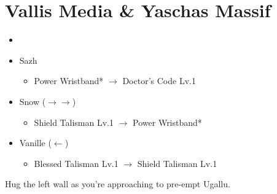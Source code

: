\chapter{Vallis Media \& Yaschas Massif}

\begin{menu}
	\begin{itemize}
		\paradigm
		\begin{itemize}
			\item {}%
			      {\paradigmline{\com}{\med}{\sen}}%
			      {\paradigmline{\com}{\rav}{\sen}}%
			      {\paradigmline[4]{\syn}{(\sab)}{(\com)}}%
			      {\paradigmline{\syn}{\sab}{\com}}%
			      {\paradigmline{\com}{\sab}{\com}}%
			      {\paradigmline{\com}{\sab}{\sen}}
		\end{itemize}
		\equip
		\begin{itemize}
			\item Sazh
				\begin{itemize}
					\item Power Wristband* $\rightarrow$ Doctor's Code Lv.1
				\end{itemize}
			\item Snow ($\rightarrow\rightarrow$)
			    \begin{itemize}
					\item Shield Talisman Lv.1 $\rightarrow$ Power Wristband*
			    \end{itemize}
			\item Vanille ($\leftarrow$)
			    \begin{itemize}
				    \item Blessed Talisman Lv.1 $\rightarrow$ Shield Talisman Lv.1
			    \end{itemize}
		\end{itemize}
	\end{itemize}
\end{menu}

Hug the left wall as you're approaching to pre-empt Ugallu.

\renewcommand{\first}{[1] Solidarity (\com/\sen/\med)}
\renewcommand{\second}{[2] Delta Attack (\com/\rav/\sen)}
\renewcommand{\third}{[3] Bully (\syn/\sab/\com)}
\renewcommand{\fourth}{[4] Bully (\syn/\sab/\com)}
\renewcommand{\fifth}{[5] Devastation (\com/\sab/\com)}
\renewcommand{\sixth}{[6] Dirty Fighting (\com/\sab/\sen)}


